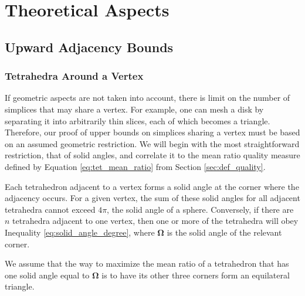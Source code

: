 
\appendix    %

\chapter{Theoretical Aspects}

\section{Upward Adjacency Bounds}

\subsection{Tetrahedra Around a Vertex}

If geometric aspects are not taken into account, there
is limit on the number of simplices that may share a vertex.
For example, one can mesh a disk by separating it into arbitrarily
thin slices, each of which becomes a triangle.
Therefore, our proof of upper bounds on simplices sharing a vertex
must be based on an assumed geometric restriction.
We will begin with the most straightforward restriction, that
of solid angles, and correlate it to the mean ratio quality measure
defined by Equation \ref{eq:tet_mean_ratio} from Section \ref{sec:def_quality}.

Each tetrahedron adjacent to a vertex forms a solid angle at
the corner where the adjacency occurs.
For a given vertex, the sum of these solid angles for all
adjacent tetrahedra cannot exceed $4\pi$, the solid angle of a sphere.
Conversely, if there are $n$ tetrahedra adjacent to one vertex,
then one or more of the tetrahedra will obey Inequality
\ref{eq:solid_angle_degree}, where $\mathbf{\Omega}$ is the
solid angle of the relevant corner.

We assume that the way to maximize the mean ratio of a tetrahedron
that has one solid angle equal to $\mathbf{\Omega}$ is to have
its other three corners form an equilateral triangle.


